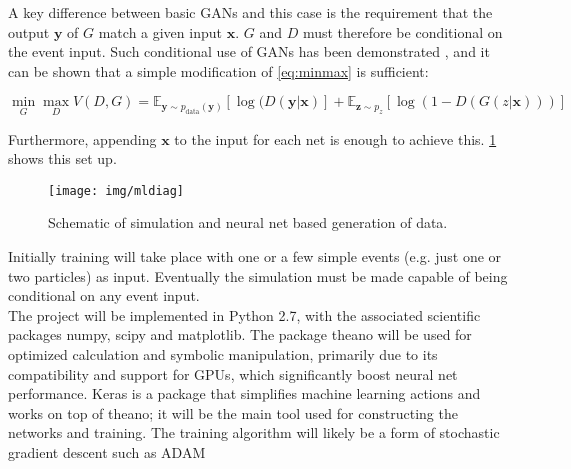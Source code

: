 \documentclass{report}
\begin{document}
A key difference between basic GANs and this case is the requirement that the output $\mathbf{y}$ of $G$ match a given input $\mathbf{x}$. $G$ and $D$ must therefore be conditional on the event input. Such conditional use of GANs has been demonstrated \cite{mirza2014conditional}, and it can be shown that a simple modification of \cref{eq:minmax} is sufficient:

\[
 \min_{G}\max_{D}V(D,G) = \mathbb{E}_{\mathbf{y}\sim p_{\text{data}}(\mathbf{y})} [\log(D(\mathbf{y|x})] + \mathbb{E}_{\mathbf{z}\sim p_{z}} [\log(1-D(G(z|\mathbf{x})))] 
\]

Furthermore, appending $\mathbf{x}$ to the input for each net is enough to achieve this. \cref{fig:mldiag} shows this set up.

\begin{figure}[H]
	\centering
	\texttt{[image: img/mldiag]}
	
	\caption{Schematic of simulation and neural net based generation of data.}
	\label{fig:mldiag}
	
\end{figure}


Initially training will take place with one or a few simple events (e.g. just one or two particles) as input. Eventually the simulation must be made capable of being conditional on any event input.\\

The project will be implemented in Python 2.7, with the associated scientific packages numpy, scipy and matplotlib. The package theano \cite{theano} will be used for optimized calculation and symbolic manipulation, primarily due to its compatibility and support for GPUs, which significantly boost neural net performance. Keras \cite{keras} is a package that simplifies machine learning actions and works on top of theano; it will be the main tool used for constructing the networks and training. The training algorithm will likely be a form of stochastic gradient descent such as ADAM \cite{adam}\\


\printbibliography

\begin{appendices}

\end{appendices}
\end{document}
